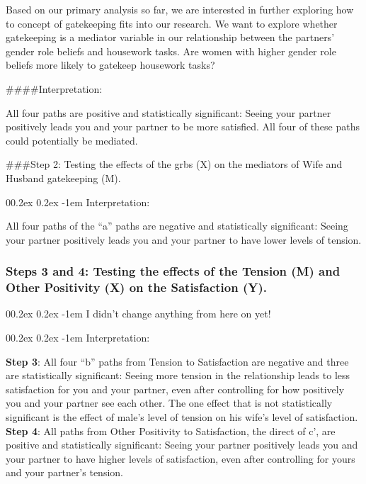\documentclass[
  english,
  man,floatsintext]{apa6}
\makeatletter
\let\oldparagraph\paragraph
\renewcommand{\paragraph}[1]{\oldparagraph{#1}\mbox{}}
\renewcommand{\paragraph}{\@startsection{paragraph}{4}{\parindent}%
  {0\baselineskip \@plus 0.2ex \@minus 0.2ex}%
  {-1em}%
  {\normalfont\normalsize\bfseries\itshape\typesectitle}}
\makeatother
\begin{document}
Based on our primary analysis so far, we are interested in further exploring how to concept of gatekeeping fits into our research. We want to explore whether gatekeeping is a mediator variable in our relationship between the partners' gender role beliefs and housework tasks. Are women with higher gender role beliefs more likely to gatekeep housework tasks?

\#\#\#\#Interpretation:

All four paths are positive and statistically significant: Seeing your partner positively leads you and your partner to be more satisfied. All four of these paths could potentially be mediated.

\#\#\#Step 2: Testing the effects of the grbs (X) on the mediators of Wife and Husband gatekeeping (M).

\hypertarget{interpretation}{%
\paragraph{Interpretation:}\label{interpretation}}

All four paths of the \enquote{a} paths are negative and statistically significant: Seeing your partner positively leads you and your partner to have lower levels of tension.

\hypertarget{steps-3-and-4-testing-the-effects-of-the-tension-m-and-other-positivity-x-on-the-satisfaction-y.}{%
\subsubsection{Steps 3 and 4: Testing the effects of the Tension (M) and Other Positivity (X) on the Satisfaction (Y).}\label{steps-3-and-4-testing-the-effects-of-the-tension-m-and-other-positivity-x-on-the-satisfaction-y.}}

\hypertarget{i-didnt-change-anything-from-here-on-yet}{%
\paragraph{I didn't change anything from here on yet!}\label{i-didnt-change-anything-from-here-on-yet}}

\hypertarget{interpretation-1}{%
\paragraph{Interpretation:}\label{interpretation-1}}

\textbf{Step 3}: All four \enquote{b} paths from Tension to Satisfaction are negative and three are statistically significant: Seeing more tension in the relationship leads to less satisfaction for you and your partner, even after controlling for how positively you and your partner see each other. The one effect that is not statistically significant is the effect of male's level of tension on his wife's level of satisfaction.\\
\textbf{Step 4}: All paths from Other Positivity to Satisfaction, the direct of c', are positive and statistically significant: Seeing your partner positively leads you and your partner to have higher levels of satisfaction, even after controlling for yours and your partner's tension.
\end{document}
